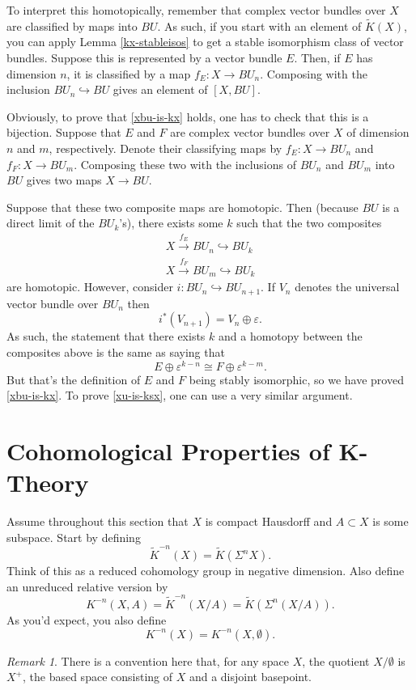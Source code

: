 \documentclass[a4paper,10pt]{article}
\theoremstyle{plain}%
\theoremstyle{definition}
\theoremstyle{remark}
\newtheorem{rem}{Remark}
\renewcommand{\epsilon}{\varepsilon}
\newcommand{\eps}{\epsilon}
\newcommand{\into}{\hookrightarrow}
\newcommand{\xto}[1]{\xrightarrow{#1}}
\begin{document}
To interpret this homotopically, remember that complex vector bundles
over $X$ are classified by maps into $BU$. As such, if you start with
an element of $\tilde{K}(X)$, you can apply Lemma \ref{kx-stableisos}
to get a stable isomorphism class of vector bundles. Suppose this is
represented by a vector bundle $E$. Then, if $E$ has dimension $n$, it
is classified by a map $f_E: X \to BU_n$. Composing with the inclusion
$BU_n \into BU$ gives an element of $[X, BU]$.

Obviously, to prove that \eqref{xbu-is-kx} holds, one has to check
that this is a bijection. Suppose that $E$ and $F$ are complex vector
bundles over $X$ of dimension $n$ and $m$, respectively. Denote their
classifying maps by $f_E: X \to BU_n$ and $f_F: X \to BU_m$. Composing
these two with the inclusions of $BU_n$ and $BU_m$ into $BU$ gives two
maps $X\to BU$.

Suppose that these two composite maps are homotopic. Then (because
$BU$ is a direct limit of the $BU_k$'s), there exists some $k$ such that
the two composites
\begin{gather*}
  X \xto{f_E} BU_n \into BU_k\\
  X \xto{f_F} BU_m \into BU_k
\end{gather*}
are homotopic. However, consider $i: BU_n \into BU_{n+1}$. If $V_n$
denotes the universal vector bundle over $BU_n$ then
\begin{equation*}
  i^*(V_{n+1}) = V_n \oplus \eps.
\end{equation*}
As such, the statement that there exists $k$ and a homotopy between
the composites above is the same as saying that
\begin{equation*}
  E \oplus \eps^{k-n} \cong F\oplus \eps^{k-m}.
\end{equation*}
But that's the definition of $E$ and $F$ being stably isomorphic, so
we have proved \eqref{xbu-is-kx}. To prove \eqref{xu-is-ksx}, one can
use a very similar argument.

\section{Cohomological Properties of K-Theory}

Assume throughout this section that $X$ is compact Hausdorff and $A
\subset X$ is some subspace. Start by defining
\begin{equation*}
  \tilde{K}^{-n}(X) = \tilde{K}(\Sigma^n X).
\end{equation*}
Think of this as a reduced cohomology group in negative
dimension. Also define an unreduced relative version by
\begin{equation*}
  K^{-n}(X, A) = \tilde{K}^{-n}(X/A) = \tilde{K}(\Sigma^n (X/A)).
\end{equation*}
As you'd expect, you also define
\begin{equation*}
  K^{-n}(X) = K^{-n}(X, \emptyset).
\end{equation*}
\begin{rem}
  There is a convention here that, for any space $X$, the quotient
  $X/\emptyset$ is $X^+$, the based space consisting of $X$ and a
  disjoint basepoint.
\end{rem}
\end{document}
